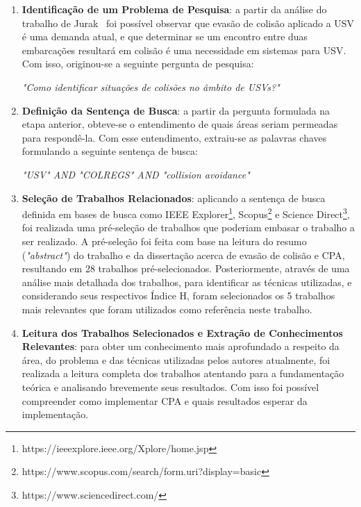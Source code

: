         \begin{enumerate}[label=\alph*)]
            \item \textbf{Identificação de um Problema de Pesquisa}: a partir da análise do trabalho de Jurak~\cite{Jurak2020COLREGS} foi possível observar que evasão de colisão aplicado a USV é uma demanda atual, e que determinar se um encontro entre duas embarcações resultará em colisão é uma necessidade em sistemas para USV. Com isso, originou-se a seguinte pergunta de pesquisa:
            
            \vspace{3mm}
            
            \centerline{\textit{"Como identificar situações de colisões no âmbito de USVs?"}}
            
            \item \textbf{Definição da Sentença de Busca}: a partir da pergunta formulada na etapa anterior, obteve-se o entendimento de quais áreas seriam permeadas para respondê-la. Com esse entendimento, extraiu-se as palavras chaves formulando a seguinte sentença de busca:
            
            \vspace{3mm}
            
            \centerline{\textit{"USV" AND "COLREGS" AND "collision avoidance"}}
            
            \item \textbf{Seleção de Trabalhos Relacionados}: aplicando a sentença de busca definida em bases de busca como IEEE Explorer\footnote{https://ieeexplore.ieee.org/Xplore/home.jsp}, Scopus\footnote{https://www.scopus.com/search/form.uri?display=basic} e Science Direct\footnote{https://www.sciencedirect.com/}, foi realizada uma pré-seleção de trabalhos que poderiam embasar o trabalho a ser realizado. A pré-seleção foi feita com base na leitura do resumo (\textit{"abstract"}) do trabalho e da dissertação acerca de evasão de colisão e CPA, resultando em 28 trabalhos pré-selecionados. Posteriormente, através de uma análise mais detalhada dos trabalhos, para identificar as técnicas utilizadas, e considerando seus respectivos Índice H, foram selecionados os 5 trabalhos mais relevantes que foram utilizados como referência neste trabalho.
            
            \item \textbf{Leitura dos Trabalhos Selecionados e Extração de Conhecimentos Relevantes}: para obter um conhecimento mais aprofundado a respeito da área, do problema e das técnicas utilizadas pelos autores atualmente, foi realizada a leitura completa dos trabalhos atentando para a fundamentação teórica e analisando brevemente seus resultados. Com isso foi possível compreender como implementar CPA e quais resultados esperar da implementação.
            

\end{enumerate}
